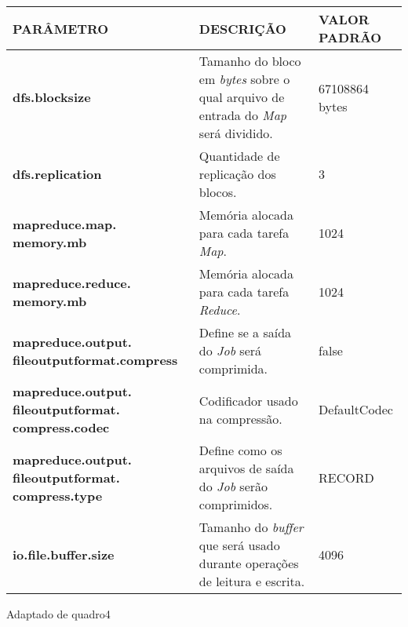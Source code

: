 {\footnotesize
  \centering
  \begin{tabular}{|p{30mm}|p{50mm}|p{30mm}|}\hline
    \textbf{PARÂMETRO}                                          & \textbf{DESCRIÇÃO}                                                                                      & \textbf{VALOR PADRÃO} \\\hline
    \textbf{dfs.blocksize}                                      & Tamanho do bloco em \textit{\gls{byte}s} sobre o qual arquivo de entrada do \textit{Map} será dividido. & 67108864 \gls{byte}s  \\\hline
    \textbf{dfs.replication}                                    & Quantidade de replicação dos blocos.                                                                    & 3                     \\\hline
    \textbf{mapreduce.map. memory.mb}                           & Memória alocada para cada tarefa \textit{Map}.                                                          & 1024                  \\\hline
    \textbf{mapreduce.reduce. memory.mb}                        & Memória alocada para cada tarefa \textit{Reduce}.                                                       & 1024                  \\\hline
    \textbf{mapreduce.output. fileoutputformat.compress}        & Define se a saída do \textit{Job} será comprimida.                                                      & false                 \\\hline
    \textbf{mapreduce.output. fileoutputformat. compress.codec} & Codificador usado na compressão.                                                                        & DefaultCodec          \\\hline
    \textbf{mapreduce.output. fileoutputformat. compress.type}  & Define como os arquivos de saída do \textit{Job} serão comprimidos.                                     & RECORD                \\\hline
    \textbf{io.file.buffer.size}                                & Tamanho do \textit{buffer} que será usado durante operações de leitura e escrita.                       & 4096                  \\\hline
  \end{tabular}}
{Adaptado de \cite{HadoopDocs321}}{quadro4}{}{}


